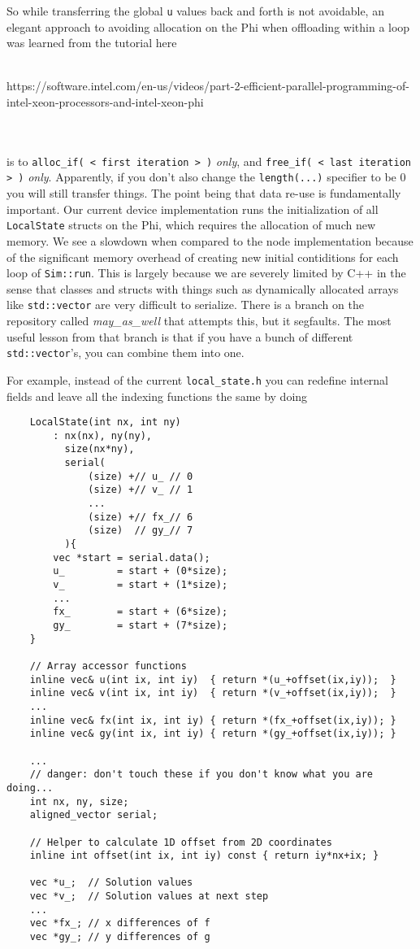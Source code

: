 So while transferring the global \texttt{u} values back and forth is not avoidable, an elegant
approach to avoiding allocation on the Phi when offloading within a loop was learned from the
tutorial here\\\\\centerline{https://software.intel.com/en-us/videos/part-2-efficient-parallel-programming-of-intel-xeon-processors-and-intel-xeon-phi}\\\\ 
is to \texttt{alloc\_if( < first iteration > )} \emph{only}, and \texttt{free\_if( < last iteration > )} \emph{only}.
Apparently, if you don't also change the \texttt{length(...)} specifier to be 0 you will still transfer things.
The point being that data re-use is fundamentally important.  Our current device implementation runs the initialization of all \texttt{LocalState}
structs on the Phi, which requires the allocation of much new memory.  We see a slowdown when compared to the node implementation because
of the significant memory overhead of creating new initial contiditions for each loop of \texttt{Sim::run}.
This is largely because we are severely limited by C++ in the sense that classes and structs with things
such as dynamically allocated arrays like \texttt{std::vector} are very difficult to serialize.  There is a
branch on the repository called \emph{may\_as\_well} that attempts this, but it segfaults.  The most useful
lesson from that branch is that if you have a bunch of different \texttt{std::vector}'s, you can combine
them into one.

\noindent For example, instead of the current \texttt{local\_state.h} you can redefine internal fields and leave all the indexing functions the same
by doing
{\tiny
\begin{lstlisting}
    LocalState(int nx, int ny)
        : nx(nx), ny(ny),
          size(nx*ny),
          serial(
              (size) +// u_ // 0
              (size) +// v_ // 1
              ...
              (size) +// fx_// 6
              (size)  // gy_// 7
          ){
        vec *start = serial.data();
        u_         = start + (0*size);
        v_         = start + (1*size);
        ...
        fx_        = start + (6*size);
        gy_        = start + (7*size);
    }

    // Array accessor functions
    inline vec& u(int ix, int iy)  { return *(u_+offset(ix,iy));  }
    inline vec& v(int ix, int iy)  { return *(v_+offset(ix,iy));  }
    ...
    inline vec& fx(int ix, int iy) { return *(fx_+offset(ix,iy)); }
    inline vec& gy(int ix, int iy) { return *(gy_+offset(ix,iy)); }

    ...
    // danger: don't touch these if you don't know what you are doing...
    int nx, ny, size;
    aligned_vector serial;

    // Helper to calculate 1D offset from 2D coordinates
    inline int offset(int ix, int iy) const { return iy*nx+ix; }

    vec *u_;  // Solution values
    vec *v_;  // Solution values at next step
    ...
    vec *fx_; // x differences of f
    vec *gy_; // y differences of g
\end{lstlisting}
}

